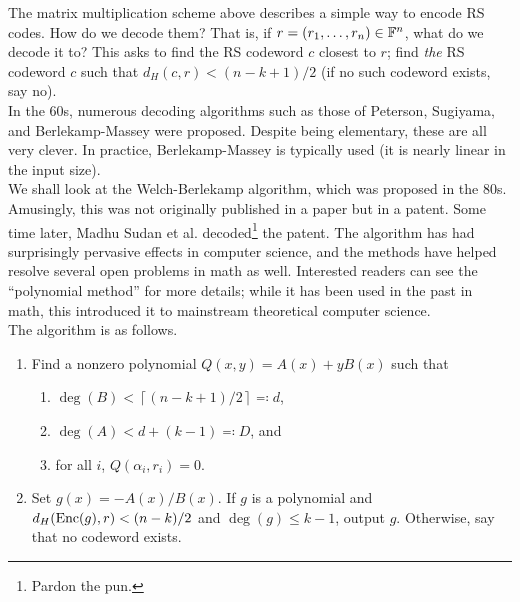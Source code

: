 			The matrix multiplication scheme above describes a simple way to encode RS codes. How do we decode them? That is, if $r = (r_1,\ldots,r_n) \in \mathbb{F}^n$, what do we decode it to? This asks to find the RS codeword $c$ closest to $r$; find \emph{the} RS codeword $c$ such that $d_H(c,r) < (n-k+1)/2$ (if no such codeword exists, say no). \\ %

			In the 60s, numerous decoding algorithms such as those of Peterson, Sugiyama, and Berlekamp-Massey were proposed. Despite being elementary, these are all very clever. In practice, Berlekamp-Massey is typically used (it is nearly linear in the input size).\\
			We shall look at the Welch-Berlekamp algorithm, which was proposed in the 80s. Amusingly, this was not originally published in a paper but in a patent. Some time later, Madhu Sudan et al. decoded\footnote{Pardon the pun.} the patent. The algorithm has had surprisingly pervasive effects in computer science, and the methods have helped resolve several open problems in math as well. Interested readers can see the ``polynomial method'' for more details; while it has been used in the past in math, this introduced it to mainstream theoretical computer science. \\
			The algorithm is as follows.

			\begin{enumerate}
				\item Find a nonzero polynomial $Q(x,y) = A(x) + yB(x)$ such that
				\begin{enumerate}
					\item $\deg(B) < \left\lceil (n-k+1)/2 \right\rceil \eqqcolon d$,
					\item $\deg(A) < d + (k-1) \eqqcolon D$, and
					\item for all $i$, $Q(\alpha_i,r_i) = 0$.
				\end{enumerate}
				\item Set $g(x) = -A(x)/B(x)$. If $g$ is a polynomial and $d_H(\operatorname{Enc}(g),r) < (n-k)/2$ and $\deg(g) \le k-1$, output $g$. Otherwise, say that no codeword exists.
			\end{enumerate}

